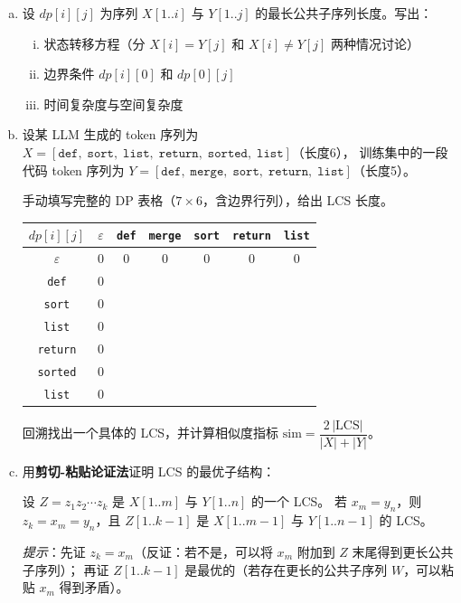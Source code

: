 \documentclass[12pt, a4paper]{ctexart}
\begin{document}
\begin{enumerate}[(a)]
    \item 设 $dp[i][j]$ 为序列 $X[1..i]$ 与 $Y[1..j]$ 的最长公共子序列长度。写出：
    \begin{enumerate}[i.]
        \item 状态转移方程（分 $X[i] = Y[j]$ 和 $X[i] \neq Y[j]$ 两种情况讨论）
        \item 边界条件 $dp[i][0]$ 和 $dp[0][j]$
        \item 时间复杂度与空间复杂度
    \end{enumerate}

    \item 设某 LLM 生成的 token 序列为
    $X = [\texttt{def},\; \texttt{sort},\; \texttt{list},\; \texttt{return},\; \texttt{sorted},\; \texttt{list}]$（长度6），
    训练集中的一段代码 token 序列为
    $Y = [\texttt{def},\; \texttt{merge},\; \texttt{sort},\; \texttt{return},\; \texttt{list}]$（长度5）。

    手动填写完整的 DP 表格（$7 \times 6$，含边界行列），给出 LCS 长度。

    \begin{center}
    \begin{tabular}{c|cccccc}
    \toprule
    $dp[i][j]$ & $\varepsilon$ & \texttt{def} & \texttt{merge} & \texttt{sort} & \texttt{return} & \texttt{list} \\
    \midrule
    $\varepsilon$ & 0 & 0 & 0 & 0 & 0 & 0 \\
    \texttt{def} & 0 & & & & & \\
    \texttt{sort} & 0 & & & & & \\
    \texttt{list} & 0 & & & & & \\
    \texttt{return} & 0 & & & & & \\
    \texttt{sorted} & 0 & & & & & \\
    \texttt{list} & 0 & & & & & \\
    \bottomrule
    \end{tabular}
    \end{center}

    回溯找出一个具体的 LCS，并计算相似度指标 $\mathrm{sim} = \dfrac{2\,|\text{LCS}|}{|X| + |Y|}$。

    \item 用\textbf{剪切-粘贴论证法}证明 LCS 的最优子结构：

    \begin{keypoint}[待证命题]
    设 $Z = z_1 z_2 \cdots z_k$ 是 $X[1..m]$ 与 $Y[1..n]$ 的一个 LCS。
    若 $x_m = y_n$，则 $z_k = x_m = y_n$，且 $Z[1..k-1]$ 是 $X[1..m{-}1]$ 与 $Y[1..n{-}1]$ 的 LCS。
    \end{keypoint}

    \textit{提示}：先证 $z_k = x_m$（反证：若不是，可以将 $x_m$ 附加到 $Z$ 末尾得到更长公共子序列）；
    再证 $Z[1..k{-}1]$ 是最优的（若存在更长的公共子序列 $W$，可以粘贴 $x_m$ 得到矛盾）。
\end{enumerate}
\end{document}
